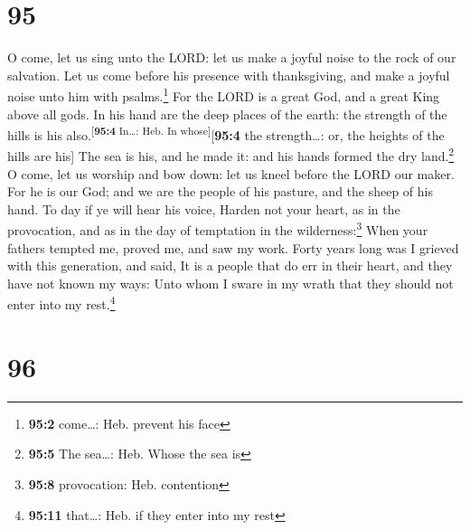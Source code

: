 \hypertarget{section-94}{%
\section{95}\label{section-94}}

 O come, let us sing unto the LORD: let us make a joyful
noise to the rock of our salvation.  Let us come before
his presence with thanksgiving, and make a joyful noise unto him with
psalms.\footnote{\textbf{95:2} come\ldots: Heb. prevent his face}
 For the LORD is a great God, and a great King above all
gods.  In his hand are the deep places of the earth: the
strength of the hills is his also.\textsuperscript{{[}\textbf{95:4}
In\ldots: Heb. In whose{]}}{[}\textbf{95:4} the strength\ldots: or, the
heights of the hills are his{]}  The sea is his, and he
made it: and his hands formed the dry land.\footnote{\textbf{95:5} The
  sea\ldots: Heb. Whose the sea is}  O come, let us
worship and bow down: let us kneel before the LORD our maker.
 For he is our God; and we are the people of his pasture,
and the sheep of his hand. To day if ye will hear his voice,
 Harden not your heart, as in the provocation, and as in
the day of temptation in the wilderness:\footnote{\textbf{95:8}
  provocation: Heb. contention}  When your fathers tempted
me, proved me, and saw my work.  Forty years long was I
grieved with this generation, and said, It is a people that do err in
their heart, and they have not known my ways:  Unto whom
I sware in my wrath that they should not enter into my rest.\footnote{\textbf{95:11}
  that\ldots: Heb. if they enter into my rest}

\hypertarget{section-95}{%
\section{96}\label{section-95}}

